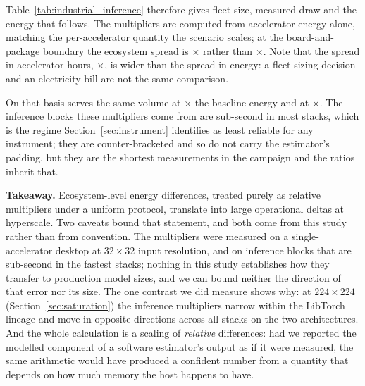 Table~\ref{tab:industrial_inference} therefore gives fleet size, measured draw
and the energy that follows. The multipliers are computed from accelerator
energy alone, matching the per-accelerator quantity the scenario scales; at the
board-and-package boundary the ecosystem spread is \vScenarioSpreadTotal$\times$
rather than \vScenarioSpreadGpu$\times$. Note that the spread in
accelerator-hours, \vScenarioSpreadTime$\times$, is wider than the spread in
energy: a fleet-sizing decision and an electricity bill are not the same
comparison.

On that basis \vScenarioBest{} serves the same volume at
\vScenarioBestMult$\times$ the baseline energy and \vScenarioWorst{} at
\vScenarioWorstMult$\times$. The inference blocks these multipliers come from
are sub-second in most stacks, which is the regime
Section~\ref{sec:instrument} identifies as least reliable for any instrument;
they are counter-bracketed and so do not carry the estimator's padding, but they
are the shortest measurements in the campaign and the ratios inherit that.

\begin{table}[t]
\centering
\caption{Projected daily energy and cost for large-scale inference at a fixed
service target ($10^5$ baseline accelerators, 24\,h, electricity at
100\,\euro/MWh). Fleet size scales with measured
accelerator-hours; energy is that fleet at each stack's own measured draw. These
are scenario arithmetic on measured quantities, not forecasts.}
\label{tab:industrial_inference}
\resizebox{0.8\textwidth}{!}{}
\end{table}

\textbf{Takeaway.}
Ecosystem-level energy differences, treated purely as relative multipliers under
a uniform protocol, translate into large operational deltas at hyperscale. Two
caveats bound that statement, and both come from this study rather than from
convention. The multipliers were measured on a single-accelerator desktop at
$32\times32$ input resolution, and on inference blocks that are sub-second in
the fastest stacks; nothing in this study establishes how they transfer to
production model sizes, and we can bound neither the direction of that error nor
its size. The one contrast we did measure shows why: at $224\times224$
(Section~\ref{sec:saturation}) the inference multipliers narrow within the
LibTorch lineage and move in opposite directions across all \vSatEcosystems{}
stacks on the two architectures. And the whole calculation
is a scaling of \emph{relative} differences: had we reported the modelled
component of a software estimator's output as if it were measured, the same
arithmetic would have produced a confident number from a quantity that depends
on how much memory the host happens to have.

